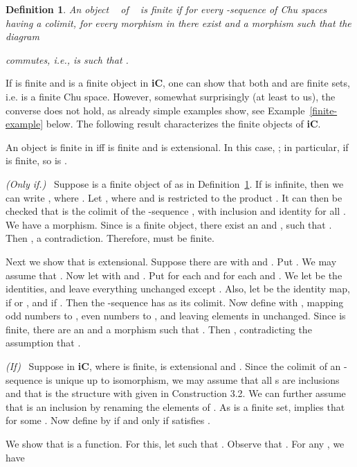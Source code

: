 \documentclass{LMCS}
\let\pf\proof
\newtheorem{defn}{Definition}[section]
\begin{document}
\begin{defn}\label{fi-def}
  An object ~ of ~ is finite if for every
  -sequence  of Chu spaces
  having a colimit, for every morphism  in 
  there exist  and a morphism  such that the diagram

commutes, i.e.,  is such that . 
\end{defn}

If  is finite and  is a finite object in
{\bf iC}, one can show that both  and  are finite sets,
i.e.  is a finite Chu space. However, somewhat surprisingly (at
least to us), the converse does not hold, as already simple examples
show, see Example~\ref{finite-example} below. The following result
characterizes the finite objects of {\bf iC}. 

\begin{thm}\label{both-finite}
  An object  is finite in  iff  is
  finite and  is extensional. In this case, ; in particular, if  is finite, so is . 
\end{thm}



\pf \emph{(Only if.)}~  Suppose  is a finite object of
 as in Definition~\ref{fi-def}.  If  is infinite, then we
can write , where .  Let , where  and  is  restricted to the
product .  It can then be checked that  is the colimit of the
-sequence , with
 inclusion and  identity
for all . We have  a
morphism.  Since  is a finite object, there exist an  and , such that . 
Then , a contradiction. 
Therefore,  must be finite. 

Next we show that  is extensional.  Suppose there are
 with  and . 
Put . We may assume that . Now let  with  and . Put
 for each  and
 for each 
and . We let  be the identities, and
 leave everything unchanged except . 
Also, let  be the identity map,  if  or , and  if . Then the
-sequence  has  as its colimit. Now define
 with , 
mapping odd numbers to , even numbers to , and leaving
elements in  unchanged.  Since  is finite, there are an
 and a morphism  such that
. 
Then , contradicting the assumption that . 


\emph{(If)}~ Suppose  in {\bf iC}, where  is
finite,  is extensional and  . Since the colimit of an -sequence is unique up to
isomorphism, we may assume that all s are inclusions and
that  is the
structure  with  given in Construction 3.2.  We can
further assume that  is an inclusion by renaming the
elements of .  As  is a finite set,  implies that  for some . 
Now define  by  if and only if
 satisfies . 

We show that   is a function. For this,
let  such that
.  Observe that .  For any , we have
\end{document}
